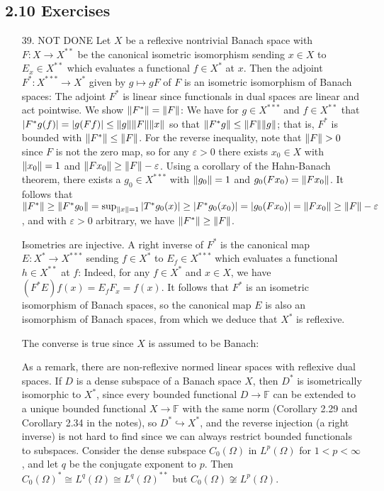 \documentclass[11pt,leqno]{article}
\theoremstyle{plain}
\theoremstyle{definition}
\numberwithin{equation}{section}
\numberwithin{lem}{section}
\begin{document}
\subsection*{2.10 Exercises}
\begin{enumerate}
  \item[39. NOT DONE] Let $X$ be a reflexive nontrivial Banach space with $F\colon X\to X^{\ast\ast}$ be the canonical isometric isomorphism sending $x\in X$ to $E_x\in X^{\ast\ast}$ which evaluates a functional $f\in X^\ast$ at $x$. Then the adjoint $F^\ast\colon X^{\ast\ast\ast}\to X^\ast$ given by $g\mapsto gF$ of $F$ is an isometric isomorphism of Banach spaces: The adjoint $F^\ast$ is linear since functionals in dual spaces are linear and act pointwise. We show $\norm{F^\ast} = \norm{F}$: We have for $g\in X^{\ast\ast\ast}$ and $f\in X^{\ast\ast}$ that $\abs{F^\ast g(f)} = \abs{g(Ff)} \leq \norm{g}\norm{F}\norm{x}$ so that $\norm{F^\ast g}\leq \norm{F}\norm{g}$; that is, $F^\ast$ is bounded with $\norm{F^\ast}\leq \norm{F}$. For the reverse inequality, note that $\norm{F}>0$ since $F$ is not the zero map, so for any $\varepsilon>0$ there exists $x_0\in X$ with $\norm{x_0} = 1$ and $\norm{Fx_0}\geq \norm{F} - \varepsilon$. Using a corollary of the Hahn-Banach theorem, there exists a $g_0\in X^{\ast\ast\ast}$ with $\norm{g_0} = 1$ and $g_0(Fx_0) = \norm{Fx_0}$. It follows that $\norm{F^\ast}\geq \norm{F^\ast g_0} = \sup_{\norm{x} =1}\abs{T^\ast g_0(x)}\geq \abs{F^\ast g_0(x_0)} = \abs{g_0(Fx_0)} = \norm{Fx_0}\geq \norm{F} - \varepsilon$, and with $\varepsilon>0$ arbitrary, we have $\norm{F^\ast}\geq \norm{F}$.
  
  Isometries are injective. A right inverse of $F^\ast$ is the canonical map $E\colon X^\ast\to X^{\ast\ast\ast}$ sending $f\in X^\ast$ to $E_f\in X^{\ast\ast\ast}$ which evaluates a functional $h\in X^{\ast\ast}$ at $f$: Indeed, for any $f\in X^\ast$ and $x\in X$, we have $(F^\ast E)f(x) = E_fF_x = f(x)$. It follows that $F^\ast$ is an isometric isomorphism of Banach spaces, so the canonical map $E$ is also an isomorphism of Banach spaces, from which we deduce that $X^\ast$ is reflexive.

  The converse is true since $X$ is assumed to be Banach:

  As a remark, there are non-reflexive normed linear spaces with reflexive dual spaces. If $D$ is a dense subspace of a Banach space $X$, then $D^\ast $ is isometrically isomorphic to $ X^\ast$, since every bounded functional $D\to \mathbb F$ can be extended to a unique bounded functional $X\to \mathbb F$ with the same norm (Corollary 2.29 and Corollary 2.34 in the notes), so $D^\ast\hookrightarrow X^\ast$, and the reverse injection (a right inverse) is not hard to find since we can always restrict bounded functionals to subspaces.
  Consider the dense subspace $C_0(\Omega)$ in $L^p(\Omega)$ for $1<p<\infty$, and let $q$ be the conjugate exponent to $p$. Then $C_0(\Omega)^\ast\cong L^q(\Omega)\cong L^q(\Omega)^{\ast\ast}$ but $C_0(\Omega)\not\cong L^p(\Omega)$.
  

\end{enumerate}
\end{document}
